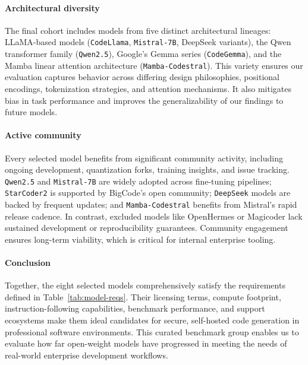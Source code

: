 \paragraph{Architectural diversity}
The final cohort includes models from five distinct architectural lineages: LLaMA-based models (\texttt{CodeLlama}, \texttt{Mistral-7B}, DeepSeek variants), the Qwen transformer family (\texttt{Qwen2.5}), Google’s Gemma series (\texttt{CodeGemma}), and the Mamba linear attention architecture (\texttt{Mamba-Codestral}). This variety ensures our evaluation captures behavior across differing design philosophies, positional encodings, tokenization strategies, and attention mechanisms. It also mitigates bias in task performance and improves the generalizability of our findings to future models.

\paragraph{Active community}
Every selected model benefits from significant community activity, including ongoing development, quantization forks, training insights, and issue tracking. \texttt{Qwen2.5} and \texttt{Mistral-7B} are widely adopted across fine-tuning pipelines; \texttt{StarCoder2} is supported by BigCode’s open community; \texttt{DeepSeek} models are backed by frequent updates; and \texttt{Mamba-Codestral} benefits from Mistral’s rapid release cadence. In contrast, excluded models like OpenHermes or Magicoder lack sustained development or reproducibility guarantees. Community engagement ensures long-term viability, which is critical for internal enterprise tooling.

\paragraph{Conclusion}
Together, the eight selected models comprehensively satisfy the requirements defined in Table~\ref{tab:model-reqs}. Their licensing terms, compute footprint, instruction-following capabilities, benchmark performance, and support ecosystems make them ideal candidates for secure, self-hosted code generation in professional software environments. This curated benchmark group enables us to evaluate how far open-weight models have progressed in meeting the needs of real-world enterprise development workflows.
